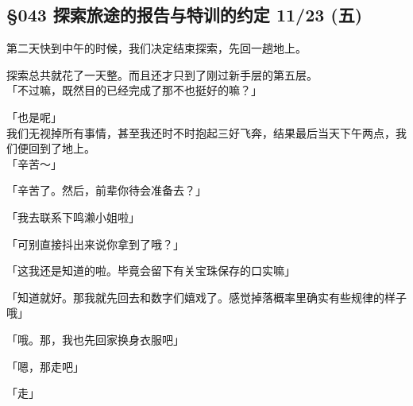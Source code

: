\subsection{§043 探索旅途的报告与特训的约定 11/23 (五)}

第二天快到中午的时候，我们决定结束探索，先回一趟地上。

探索总共就花了一天整。而且还才只到了刚过新手层的第五层。\\

「不过嘛，既然目的已经完成了那不也挺好的嘛？」

「也是呢」\\

我们无视掉所有事情，甚至我还时不时抱起三好飞奔，结果最后当天下午两点，我们便回到了地上。\\

「辛苦～」

「辛苦了。然后，前辈你待会准备去？」

「我去联系下鸣濑小姐啦」

「可别直接抖出来说你拿到了哦？」

「这我还是知道的啦。毕竟会留下有关宝珠保存的口实嘛」

「知道就好。那我就先回去和数字们嬉戏了。感觉掉落概率里确实有些规律的样子哦」

「哦。那，我也先回家换身衣服吧」

「嗯，那走吧」

「走」\\

